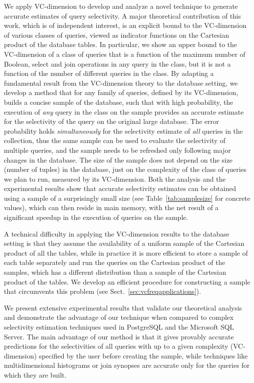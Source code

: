 We apply VC-dimension to develop and analyze a novel technique to generate
accurate estimates of query selectivity. A major theoretical contribution of
this work, which is of independent interest, is an explicit bound to the
VC-dimension of various classes of queries, viewed as indicator functions on the
Cartesian product of the database tables. In particular, we show an upper bound
to the VC-dimension of a class of queries that is a function of the maximum
number of Boolean, select and join operations in any query in the class, but it
is not a function of the number of different queries in the class. By adapting a
fundamental result from the VC-dimension theory to the database setting, we
develop a method that for any family of queries, defined by its VC-dimension,
builds a concise sample of the database, such that with high probability, the
execution of \emph{any} query in the class on the sample provides an accurate
estimate for the selectivity of the query on the original large database. The
error probability holds \emph{simultaneously} for the selectivity estimate of
\emph{all} queries in the collection, thus the same sample can be used to
evaluate the selectivity of multiple queries, and the sample needs to be
refreshed only following major changes in the database. The size of the sample
does not depend on the size (number of tuples) in the database, just on the
complexity of the class of queries we plan to run, measured by its VC-dimension.
Both the analysis and the experimental results show that accurate selectivity
estimates can be obtained using a sample of a surprisingly small size (see
Table~\ref{tab:samplesize} for concrete values), which can then reside in main
memory, with the net result of a significant speedup in the execution of
queries on the sample. 

A technical difficulty in applying the VC-dimension results to the database
setting is that they assume the availability of a uniform sample of the
Cartesian product of all the tables, while in practice it is more efficient to
store a sample of each table separately and run the queries on the Cartesian
product of the samples, which has a different distribution than a sample of the
Cartesian product of the tables. We develop an efficient procedure for
constructing a sample that circumvents this problem (see
Sect.~\ref{sec:vcfreqapplications}).

We present extensive experimental results that validate our theoretical analysis
and demonstrate the advantage of our technique when compared to complex
selectivity estimation techniques used in PostgreSQL and the Microsoft SQL
Server. The main advantage of our method is that it gives provably accurate
predictions for the selectivities of all queries with up to a given complexity
(VC-dimension) specified by the user before creating the sample, while
techniques like multidimensional histograms or join synopses are accurate only
for the queries for which they are built.

